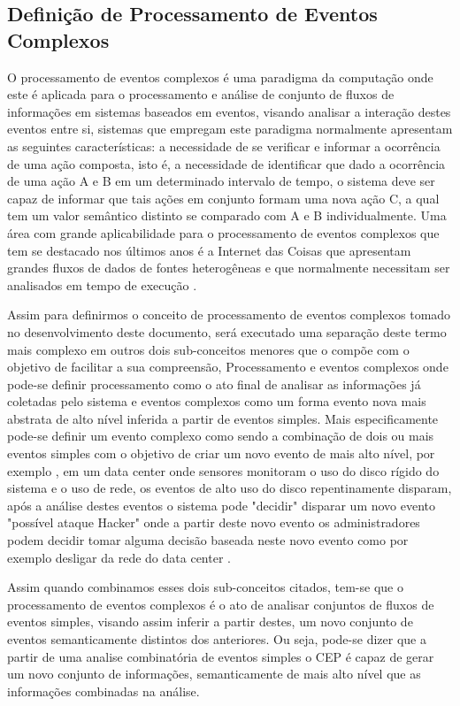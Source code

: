 \documentclass[ti,table]{texufpel} %
\begin{document}
\subsection{Definição de Processamento de Eventos Complexos}
O processamento de eventos complexos é uma paradigma da computação onde este é aplicada para o processamento e análise de conjunto de fluxos de informações em sistemas baseados em eventos, visando analisar a interação destes eventos entre si, sistemas que empregam este paradigma normalmente apresentam as seguintes características: a necessidade de se verificar e informar a ocorrência de uma ação composta, isto é, a necessidade de identificar que dado a ocorrência de uma ação A e B em um determinado intervalo de tempo, o sistema deve ser capaz de informar que tais ações em conjunto formam uma nova ação C, a qual tem um valor semântico distinto se comparado com A e B individualmente. Uma área com grande aplicabilidade para o processamento de eventos complexos que tem se destacado nos últimos anos é a Internet das Coisas que apresentam grandes fluxos de dados de fontes heterogêneas e que normalmente necessitam ser analisados em tempo de execução \cite{jun2014design}. 

Assim para definirmos o conceito de processamento de eventos complexos tomado no desenvolvimento deste documento, será executado uma separação deste termo mais complexo em outros dois sub-conceitos menores que o compõe com o objetivo de facilitar a sua compreensão, Processamento e eventos complexos onde pode-se definir processamento como o ato final de analisar as informações já coletadas pelo sistema e eventos complexos como um forma evento nova mais abstrata de alto nível inferida a partir de eventos simples. Mais especificamente pode-se definir um evento complexo como sendo a combinação de dois ou mais eventos simples com o objetivo de criar um novo evento de mais alto nível, por exemplo \cite{dayarathna2018recent}, em um data center onde sensores monitoram o uso do disco rígido do sistema e o uso de rede, os eventos de alto uso do disco repentinamente disparam, após a análise destes eventos o sistema pode "decidir" disparar um novo evento "possível ataque Hacker" onde a partir deste novo evento os administradores podem decidir tomar alguma decisão  baseada neste novo evento como por exemplo desligar da rede do data center \cite{wu2006high}. 

Assim quando combinamos esses dois sub-conceitos citados, tem-se que o processamento de eventos complexos é o ato de analisar conjuntos de fluxos de eventos simples, visando assim inferir a partir destes, um novo conjunto de eventos semanticamente distintos dos anteriores. Ou seja, pode-se dizer que a partir de uma analise combinatória de eventos simples o CEP é capaz de gerar um novo conjunto de informações, semanticamente de mais alto nível que as informações combinadas na análise.
\end{document}
